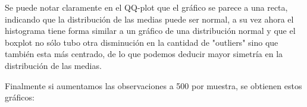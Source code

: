 \documentclass[a4paper]{article}
\begin{document}
\begin{figure}[H]
		\hfill
	\end{figure}
	
	Se puede notar claramente en el QQ-plot que el gr\'afico se parece a una recta, indicando que la distribuci\'on de las medias puede ser normal, a su vez ahora el histograma tiene forma similar a un gr\'afico de una distribuci\'on normal y que el boxplot no s\'olo tubo otra disminuci\'on en la cantidad de "outliers" sino que tambi\'en esta m\'as centrado, de lo que podemos deducir mayor simetr\'ia en la distribuci\'on de las medias.
	
	Finalmente si aumentamos las observaciones a 500 por muestra, se obtienen estos gr\'aficos:
	
\end{document}
